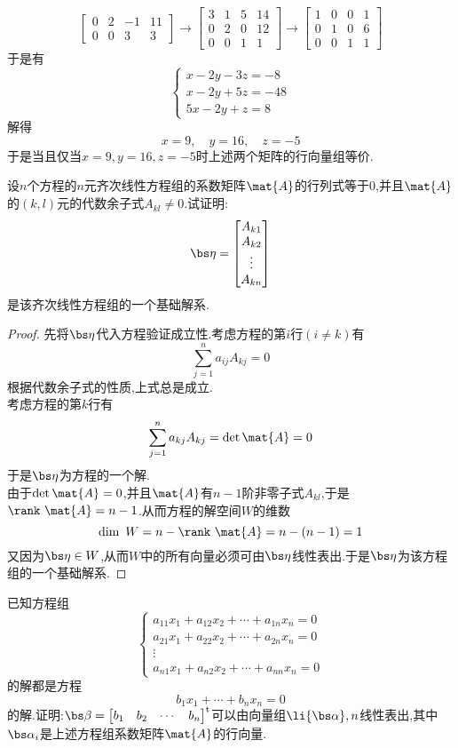 \documentclass{ctexart}
\begin{document}
\begin{solution}
\[\begin{bmatrix}
        0&2&-1&11\\
        0&0&3&3
    \end{bmatrix}\longrightarrow\begin{bmatrix}
        3&1&5&14\\
        0&2&0&12\\
        0&0&1&1
    \end{bmatrix}\longrightarrow\begin{bmatrix}
        1&0&0&1\\
        0&1&0&6\\
        0&0&1&1
    \end{bmatrix}\]
    于是有
    \[\left\{\begin{array}{l}
        x-2y-3z=-8\\
        x-2y+5z=-48\\
        5x-2y+z=8
    \end{array}\right.\]
    解得
    \[x=9,\quad y=16,\quad z=-5\]
    于是当且仅当$x=9,y=16,z=-5$时上述两个矩阵的行向量组等价.
\end{solution}
\begin{homework}[8]
    设$n$个方程的$n$元齐次线性方程组的系数矩阵$\mat{A}$的行列式等于$0$,并且$\mat{A}$的$(k,l)$元的代数余子式$A_{kl}\neq0$.试证明:
    \[\bs\eta=\begin{bmatrix}
        A_{k1}\\A_{k2}\\\vdots\\A_{kn}
    \end{bmatrix}\]
    是该齐次线性方程组的一个基础解系.
\end{homework}
\begin{proof}
    先将$\bs\eta$代入方程验证成立性.考虑方程的第$i$行$(i\neq k)$有
    \[\sum_{j=1}^{n}a_{ij}A_{kj}=0\]
    根据代数余子式的性质,上式总是成立.\\
    考虑方程的第$k$行有
    \[\sum_{j=1}^{n}a_{kj}A_{kj}=\det\mat{A}=0\]
    于是$\bs\eta$为方程的一个解.\\
    由于$\det\mat{A}=0$,并且$\mat{A}$有$n-1$阶非零子式$A_{kl}$,于是$\rank\ \mat{A}=n-1$.从而方程的解空间$W$的维数
    \[\dim\ W=n-\rank\ \mat{A}=n-(n-1)=1\]
    又因为$\bs\eta\in W$,从而$W$中的所有向量必须可由$\bs\eta$线性表出.于是$\bs\eta$为该方程组的一个基础解系.
\end{proof}
\begin{homework}[9]
    已知方程组
    \[\left\{\begin{array}{c}
        a_{11}x_1+a_{12}x_2+\cdots+a_{1n}x_n=0\\
        a_{21}x_1+a_{22}x_2+\cdots+a_{2n}x_n=0\\
        \vdots\\
        a_{n1}x_1+a_{n2}x_2+\cdots+a_{nn}x_n=0
    \end{array}\right.\]
    的解都是方程
    \[b_1x_1+\cdots+b_nx_n=0\]
    的解.证明:$\bs\beta=\begin{bmatrix}
        b_1&b_2&\cdots&b_n
    \end{bmatrix}^{\text{t}}$可以由向量组$\li{\bs\alpha},n$线性表出,其中$\bs\alpha_i$是上述方程组系数矩阵$\mat{A}$的行向量.
\end{homework}
\end{document}

